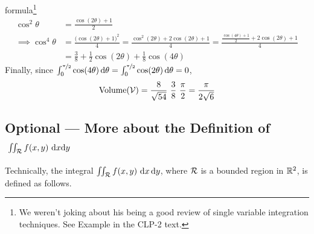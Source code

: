 \begin{eg}
formula\footnote{We weren't joking about his being a good review of
single variable integration techniques. See Example  
in the CLP-2 text.}
\begin{align*}
\cos^2\theta &=\frac{\cos(2\theta)+1}{2} \\
\implies \cos^4\theta &= \frac{\big(\cos(2\theta)+1\big)^2}{4}
    =\frac{\cos^2(2\theta)+2\cos(2\theta)+1}{4}
    =\frac{\frac{\cos(4\theta)+1}{2}+2\cos(2\theta)+1}{4} \\
   &=\frac{3}{8} +\frac{1}{2}\cos(2\theta) +\frac{1}{8}\cos(4\theta)
\end{align*}
Finally, since $\int_0^{\nicefrac{\pi}{2}} \cos(4\theta)\,\mathrm{d}\theta
               =\int_0^{\nicefrac{\pi}{2}} \cos(2\theta)\,\mathrm{d}\theta
               =0$,
\begin{align*}
\text{Volume}(\mathcal{V}) = \frac{8}{\sqrt{54}}\ \frac{3}{8}\ \frac{\pi}{2}
  =\frac{\pi}{2\sqrt{6}}
\end{align*}


\end{eg}

\subsection{Optional --- More about the Definition of 
$\ \iint_{\mathcal{R}} f(x,y)\ \mathrm{d}x\mathrm{d}y$}
\label{sec def int more}

Technically, the integral $\iint_{\mathcal{R}} f(x,y)\ \mathrm{d}x\,\mathrm{d}y$, where 
$\mathcal{R}$ is a bounded region in $\mathbb{R}^2$, is defined as follows. 

